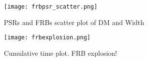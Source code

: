 

\begin{frame}
\begin{figure}
\centering
\texttt{[image: frbpsr\_scatter.png]}
\label{fig:scatter}
\caption{PSRs and FRBs scatter plot of DM and Width}
\end{figure}
\end{frame}

\begin{frame}
\begin{figure}
\centering
\texttt{[image: frbexplosion.png]}
\label{fig:frbx}
\caption{Cumulative time plot. FRB explosion!}
\end{figure}
\end{frame}

